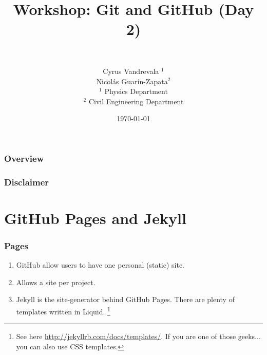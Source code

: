 


\title{Workshop: Git and GitHub (Day 2)}
\subtitle{~}
\author[AUTHOR]{\scriptsize{Cyrus Vandrevala $^1$\\Nicol\'as Guar\'in-Zapata$^2$}\\
\tiny{$^1$ Physics Department\\ $^2$ Civil Engineering Department}}
\date{\today}




\begin{frame}[plain]
 \titlepage
\end{frame}

\begin{frame}
    \frametitle{\large{Overview}}
    \tableofcontents
\end{frame}


\begin{frame}
    \frametitle{Disclaimer}
\end{frame}


\section[GitHub Pages]{GitHub Pages and Jekyll}

\begin{frame}
    \frametitle{Pages}
    
    \begin{enumerate}
    \item GitHub allow users to have one personal (static) site. \pause
    
    \item Allows a site per project. \pause
    
    \item Jekyll is the site-generator behind GitHub Pages. There are plenty of templates written in Liquid. \footnote{See here \url{http://jekyllrb.com/docs/templates/}. If you are one of those geeks... you can also use CSS templates.}

    \end{enumerate}
\end{frame}
      

